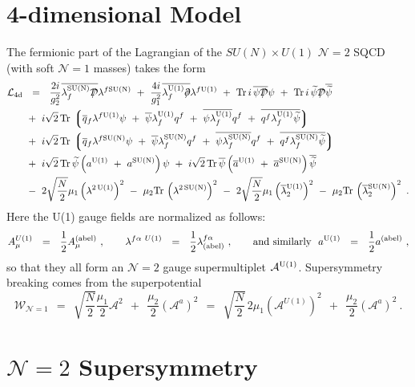 \documentclass{article}
\newcommand{\p}{\partial}
\newcommand{\wt}{\widetilde}
\newcommand{\ov}{\overline}
\newcommand{\mc}[1]{\mathcal{#1}}
\newcommand{\md}{\mathcal{D}}
\newcommand{\lgr}{\left\lgroup}
\newcommand{\rgr}{\right\rgroup}
\def\slashed#1{\setbox0=\hbox{$#1$}             %
   \dimen0=\wd0                                 %
   \setbox1=\hbox{/} \dimen1=\wd1               %
   \ifdim\dimen0>\dimen1                        %
      \rlap{\hbox to \dimen0{\hfil/\hfil}}      %
      #1                                        %
   \else                                        %
      \rlap{\hbox to \dimen1{\hfil$#1$\hfil}}   %
      /                                         %
   \fi}                                        %
\newcommand{\aU}{a^{\rm U(1)}}
\newcommand{\aN}{a^{\rm SU(N)}}
\newcommand{\baU}{\ov{a}{}^{\rm U(1)}}
\newcommand{\baN}{\ov{a}{}^{\rm SU(N)}}
\newcommand{\lU}{\lambda^{\rm U(1)}}
\newcommand{\lN}{\lambda^{\rm SU(N)}}
\newcommand{\Tr}{{\rm Tr\,}}
\begin{document}
\section{4-dimensional Model}

The fermionic part of the Lagrangian of the $ SU(N) \times U(1) $ $ \mc{N}=2 $ SQCD (with soft $ \mc{N}=1 $ masses) 
takes the form
\begin{align*}
%
\mc{L}_{\rm 4d} & ~~=~~ \frac{2i}{g_2^2} \ov{\lN_f \slashed{\md}} \lambda^{f{\rm SU(N)}}
		~+~ \frac{4i}{g_1^2} \ov{\lU_f \slashed{\p}} \lambda^{f{\rm U(1)}}
		~+~ \Tr i\, \ov{\psi \slashed{\md}} \psi  
		~+~ \Tr i\, \wt{\psi} \slashed{\md} \ov{\wt{\psi}}
		\\
%
		& 
		~+~
		i\sqrt{2}\, \Tr \lgr \ov{q}{}_f \lambda^{f{\rm U(1)}}\psi 
				  ~+~ \ov{\psi} \lU_f q^f  
				  ~+~ \ov{\psi \lU_f} q^f
				  ~+~ \ov{q^f \lU_f \wt{\psi}} 
				\rgr
		\\
%
		&
		~+~
		i\sqrt{2}\, \Tr \lgr \ov{q}{}_f \lambda^{f{\rm SU(N)}} \psi 
					~+~ \ov{\psi} \lN_f q^f
					~+~ \ov{\psi \lN_f} q^f
					~+~ \ov{q^f \lN_f \wt{\psi}}
				\rgr
		\\
%
		&
		~+~
		i\sqrt{2}\, \Tr \wt{\psi} \left( \aU ~+~ \aN \right) \psi  
		~+~ 
		i\sqrt{2}\, \Tr \ov{\psi} \left( \baU ~+~ \baN \right) \ov{\wt{\psi}}
		\\
%
		&
		~-~
		2 \sqrt{\frac{N}{2}} \mu_1 \left( \lambda^{2\,{\rm U(1)}} \right)^2 
		~-~
		\mu_2 \Tr \left( \lambda^{2\,{\rm SU(N)}} \right)^2
		~-~
		2 \sqrt{\frac{N}{2}} \mu_1 \left( \ov{\lambda}{}^{\rm U(1)}_2 \right)^2
		~-~
		\mu_2 \Tr \left( \ov{\lambda}{}^{\rm SU(N)}_2 \right)^2~.
\end{align*}
	Here the U(1) gauge fields are normalized as follows:
\begin{equation}
\label{abel_norm}
	A^{U(1)}_\mu ~~=~~ \frac 1 2 A^{\rm (abel)}_\mu ~, 
	\qquad   \lambda^{f\alpha\ U(1)} ~~=~~ \frac 1 2 \lambda^{f\alpha}_{\rm (abel)} ~,
	\qquad
	\text{and similarly}~~
	\aU ~~=~~ \frac 1 2 a^{\rm (abel)}~,
\end{equation}
	so that they all form an $ \mc{N}=2 $ gauge supermultiplet $ \mc{A}^{\rm U(1)} $.
	Supersymmetry breaking comes from the superpotential
\[
	\mc{W}_{\mc{N}=1} ~~=~~ \sqrt{\frac{N}{2}}\frac{\mu_1}{2} \mc{A}^2 ~~+~~ 
				\frac{\mu_2}{2} \left( \mc{A}^a \right)^2  
			~~=~~ \sqrt{\frac{N}{2}}\, 2\mu_1 \left(\mc{A}^{U(1)}\right)^2  ~~+~~
				\frac{\mu_2}{2} \left( \mc{A}^a \right)^2 ~.
\]


\section{$\mathcal{N}=2$ Supersymmetry}
\end{document}
